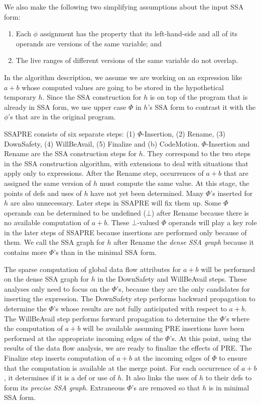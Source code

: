 We also make the following two simplifying assumptions about the input SSA
form:
\begin{enumerate}
\item Each $\phi$ assignment has the property that its left-hand-side and
all of its operands are versions of the same variable; and
\item The live ranges of different versions of the same variable do not
overlap.
\end{enumerate}

In the algorithm description, we assume we are working on an expression like
$a+b$ whose computed values are going to be stored in the hypothetical
temporary $h$.  Since the SSA construction for $h$ is on top of the program
that is already in SSA form, we use upper case $\Phi$ in $h$'s SSA form to 
contrast it with the $\phi$'s that are in the original program.

SSAPRE consists of six separate steps: (1) $\Phi$-Insertion, (2) Rename,
(3) DownSafety, (4) WillBeAvail, (5) Finalize and (b) CodeMotion.
$\Phi$-Insertion and Rename are the SSA construction steps for $h$.  They
correspond to the two steps in the SSA construction algorithm, with 
extensions to deal with situations that apply only to expressions.  After
the Rename step, occurrences of $a+b$ that are assigned the same version
of $h$ must compute the same value.  At this stage, the points of defs and
uses of $h$ have not yet been determined.  Many $\Phi$'s inserted for $h$
are also unnecessary.  Later steps in SSAPRE will fix them up.  Some $\Phi$
operands can be determined to be undefined ($\bot$) after Rename because 
there is no available computation of $a+b$.  These $\bot$-valued
$\Phi$ operands will play a key role in the later steps of SSAPRE because
insertions are performed only because of them.  We call the SSA graph for
$h$ after Rename the \emph{dense SSA graph} because it contains more $\Phi$'s
than in the minimal SSA form.

The sparse computation of global data flow attributes for $a+b$ will be
performed on the dense SSA graph for $h$ in the DownSafety and WillBeAvail
steps.  These analyses only need to focus on the $\Phi$'s, because they
are the only candidates for inserting the expression.
The DownSafety step performs backward propagation to determine 
the $\Phi$'s whose results are not fully anticipated with respect to 
$a+b$.  The WillBeAvail step performs forward propagation to determine
the $\Phi$'s where the computation of $a+b$ will be available assuming
PRE insertions have been performed at the appropriate incoming edges of the
$\Phi$'s.  At this point, using the results of the data flow analysis, we
are ready to finalize the effects of PRE.  The Finalize step inserts
computation of $a+b$ at the incoming edges of $\Phi$ to ensure that the
computation is available at the merge point.  For each occurrence of 
$a+b$, it determines if it is a def or use of $h$.  It also links the
uses of $h$ to their defs to form its \emph{precise SSA graph}.
Extraneous $\Phi$'s are removed so that $h$ is in minimal SSA form.

